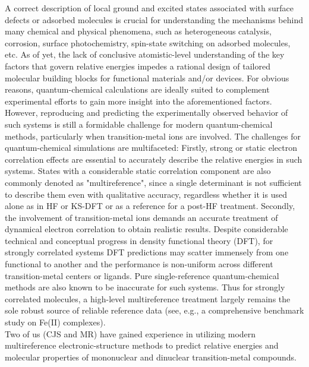 \documentclass[a4paper,11pt,headings=normal]{scrartcl}
\begin{document}
A correct description of local ground and excited states 
associated with surface defects or adsorbed molecules is crucial for understanding 
the mechanisms 
behind many chemical and physical phenomena, such as heterogeneous catalysis, 
corrosion, surface photochemistry, spin-state switching on adsorbed molecules, 
etc. As of yet, the lack of conclusive atomistic-level understanding of the key 
factors that govern relative energies impedes a rational design 
of tailored molecular building blocks for functional materials and/or devices. 
For obvious reasons, quantum-chemical calculations are ideally suited to 
complement experimental efforts to gain more insight into the aforementioned 
factors. However, reproducing and predicting the experimentally observed behavior 
of such systems is still a formidable challenge for modern quantum-chemical 
methods, particularly when transition-metal ions are involved. The challenges for 
quantum-chemical simulations are multifaceted: Firstly, strong or static electron 
correlation effects are essential to accurately describe the relative energies 
in such systems.\autocite{Pierloot2018, Radon2018, Gagliardi2019a, Mauracher2020, 
Roemelt2021} States with a considerable 
static correlation component are also commonly denoted as "multireference", since a 
single determinant is not sufficient to describe them even with qualitative 
accuracy, regardless whether it is used alone as in HF or KS-DFT or as a reference 
for a post-HF treatment.  Secondly, the involvement of transition-metal
ions demands an accurate treatment of dynamical electron correlation 
to obtain realistic results.\autocite{Reiher2016, Pierloot2018, Roemelt2021} 
Despite considerable technical and conceptual progress in density functional 
theory (DFT), for strongly correlated systems DFT predictions may scatter 
immensely from one functional to another and the performance is non-uniform across 
different transition-metal centers or ligands. Pure single-reference quantum-chemical methods 
are also known to be inaccurate for such systems. Thus for 
strongly correlated molecules, a high-level multireference treatment largely 
remains the sole robust source of reliable reference data (see, e.g., a 
comprehensive benchmark study on Fe(II) complexes\autocite{Reimann_2022}).\\
Two of us (CJS and MR) have gained  experience in utilizing modern 
multireference electronic-structure methods to predict relative 
energies and molecular properties of mononuclear and dinuclear transition-metal 
compounds.\autocite{Pantazis2018, Krewald2019, Nam2024, Hirsch2025} 
\end{document}
